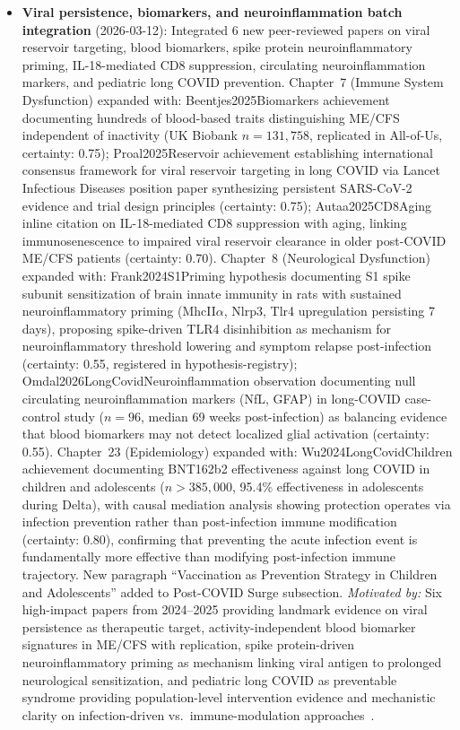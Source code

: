 \begin{itemize}
  \item \textbf{Viral persistence, biomarkers, and neuroinflammation batch integration} (2026-03-12):
    Integrated 6 new peer-reviewed papers on viral reservoir targeting, blood biomarkers,
    spike protein neuroinflammatory priming, IL-18-mediated CD8 suppression, circulating
    neuroinflammation markers, and pediatric long COVID prevention.
    Chapter~7 (Immune System Dysfunction) expanded with: Beentjes2025Biomarkers achievement
    documenting hundreds of blood-based traits distinguishing ME/CFS independent of inactivity
    (UK Biobank $n=131{,}758$, replicated in All-of-Us, certainty: 0.75); Proal2025Reservoir
    achievement establishing international consensus framework for viral reservoir targeting
    in long COVID via Lancet Infectious Diseases position paper synthesizing persistent
    SARS-CoV-2 evidence and trial design principles (certainty: 0.75); Autaa2025CD8Aging
    inline citation on IL-18-mediated CD8 suppression with aging, linking immunosenescence
    to impaired viral reservoir clearance in older post-COVID ME/CFS patients (certainty: 0.70).
    Chapter~8 (Neurological Dysfunction) expanded with: Frank2024S1Priming hypothesis
    documenting S1 spike subunit sensitization of brain innate immunity in rats with
    sustained neuroinflammatory priming (MhcII$\alpha$, Nlrp3, Tlr4 upregulation persisting
    7 days), proposing spike-driven TLR4 disinhibition as mechanism for neuroinflammatory
    threshold lowering and symptom relapse post-infection (certainty: 0.55, registered in
    hypothesis-registry); Omdal2026LongCovidNeuroinflammation observation documenting null
    circulating neuroinflammation markers (NfL, GFAP) in long-COVID case-control study
    ($n=96$, median 69 weeks post-infection) as balancing evidence that blood biomarkers
    may not detect localized glial activation (certainty: 0.55).
    Chapter~23 (Epidemiology) expanded with: Wu2024LongCovidChildren achievement documenting
    BNT162b2 effectiveness against long COVID in children and adolescents ($n>385{,}000$,
    95.4\% effectiveness in adolescents during Delta), with causal mediation analysis
    showing protection operates via infection prevention rather than post-infection immune
    modification (certainty: 0.80), confirming that preventing the acute infection event
    is fundamentally more effective than modifying post-infection immune trajectory.
    New paragraph ``Vaccination as Prevention Strategy in Children and Adolescents'' added
    to Post-COVID Surge subsection.
    \textit{Motivated by:} Six high-impact papers from 2024--2025 providing landmark
    evidence on viral persistence as therapeutic target, activity-independent blood biomarker
    signatures in ME/CFS with replication, spike protein-driven neuroinflammatory priming
    as mechanism linking viral antigen to prolonged neurological sensitization, and pediatric
    long COVID as preventable syndrome providing population-level intervention evidence and
    mechanistic clarity on infection-driven vs.\ immune-modulation approaches~\cite{Beentjes2025Biomarkers,Proal2025Reservoir,Frank2024S1Priming,Autaa2025CD8Aging,Omdal2026LongCovidNeuroinflammation,Wu2024LongCovidChildren}.


\end{itemize}
